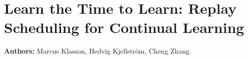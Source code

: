 
\section{Learn the Time to Learn: Replay Scheduling for Continual Learning}
\label{sec:paperC}

\textbf{Authors:} Marcus Klasson, Hedvig Kjellström, Cheng Zhang. 